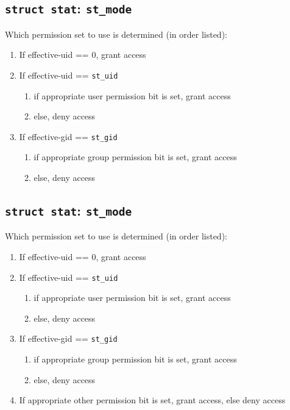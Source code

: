 \documentclass[xga]{xdvislides}
\begin{document}
\subsection{{\tt struct stat}: {\tt st\_mode}}
Which permission set to use is determined (in order listed):
\begin{enumerate}
	\item If effective-uid == 0, grant access
	\item If effective-uid == {\tt st\_uid}
		\begin{enumerate}
			\item if appropriate user permission bit is set, grant access
			\item else, deny access
		\end{enumerate}
	\item If effective-gid == {\tt st\_gid}
		\begin{enumerate}
			\item if appropriate group permission bit is set, grant access
			\item else, deny access
		\end{enumerate}
\end{enumerate}

\subsection{{\tt struct stat}: {\tt st\_mode}}
Which permission set to use is determined (in order listed):
\begin{enumerate}
	\item If effective-uid == 0, grant access
	\item If effective-uid == {\tt st\_uid}
		\begin{enumerate}
			\item if appropriate user permission bit is set, grant access
			\item else, deny access
		\end{enumerate}
	\item If effective-gid == {\tt st\_gid}
		\begin{enumerate}
			\item if appropriate group permission bit is set, grant access
			\item else, deny access
		\end{enumerate}
	\item If appropriate other permission bit is set, grant access, else deny access
\end{enumerate}
\end{document}
